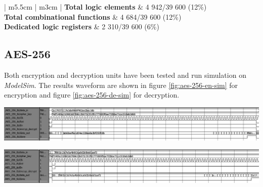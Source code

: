 \documentclass[a4paper, 10pt]{article}
\newenvironment{Figure}
    {\par\medskip\noindent\minipage{\linewidth}}
    {\endminipage\par\medskip}
\begin{document}
\begin{multicols}{2}
	\noindent
	\begin{center}
		\label{tab:keyexpansion}
                    \begin{tabular}{| m{5.5cm} | m{3cm} |}
		\hline   
		\textbf{Total logic elements} & 4 942/39 600 (12\%)\\
                        \hline
                        \textbf{Total combinational functions} & 4 684/39 600 (12\%)\\
                        \hline
                        \textbf{Dedicated logic registers} & 2 310/39 600 (6\%)\\
                        \hline
                    \end{tabular}
	\end{center}

        \subsection{AES-256}

	Both encryption and decryption units have been tested and run simulation on \textit{ModelSim}. The results waveform are shown in figure \ref{fig:aes-256-en-sim} for encryption and figure \ref{fig:aes-256-de-sim} for decryption.

	\begin{Figure}
                \centering
                \includegraphics[width=\linewidth]{aes-256-encryption-waveform-edited.png}
                \label{fig:aes-256-en-sim}
            \end{Figure}

	\begin{Figure}
                \centering
                \includegraphics[width=\linewidth]{aes-256-decryption-waveform-edited.png}
                \label{fig:aes-256-de-sim}
            \end{Figure}


\end{multicols}
\end{document}
